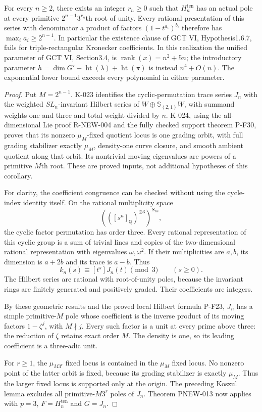 \begin{corollary}
For every $n\ge2$, there exists an integer $r_n\ge0$ such that
$H_n^{\mathrm{ten}}$ has an actual pole at every primitive
$2^{n-1}3^{r_n}$th root of unity. Every rational presentation
of this series with denominator a product of factors
$(1-t^{a_i})^{b_i}$ therefore has $\max_i a_i\ge2^{n-1}$.
In particular the existence clause of GCT VI,
Hypothesis1.6.7, fails for triple-rectangular Kronecker
coefficients. In this realization the unified parameter of
GCT VI, Section3.4, is $\operatorname{rank}(x)=n^2+5n$;
the introductory parameter
$h=\dim G'+\operatorname{ht}(\lambda)+\operatorname{ht}(\pi)$
is instead $n^4+O(n)$. The exponential lower bound exceeds
every polynomial in either parameter.
\end{corollary}
\begin{proof}
Put $M=2^{n-1}$. K-023 identifies the cyclic-permutation
trace series $J_n$ with the weighted $SL_n$-invariant Hilbert
series of $W\oplus\mathbb S_{(2,1)}W$, with summand weights
one and three and total weight divided by $n$.
K-024, using the all-dimensional Lie proof R-NEW-004 and
the fully checked support theorem P-F30, proves that its
nonzero $\mu_M$-fixed quotient locus is one grading orbit,
with full grading stabilizer exactly $\mu_M$, density-one
curve closure, and smooth ambient quotient along that orbit.
Its nontrivial moving eigenvalues are powers of a primitive
$M$th root. These are proved inputs, not additional
hypotheses of this corollary.

For clarity, the coefficient congruence can be checked without
using the cycle-index identity itself. On the rational
multiplicity space
\[
 (([s^n]_{\mathbb Q})^{\otimes3})^{S_{ns}},
\]
the cyclic factor permutation has order three. Every rational
representation of this cyclic group is a sum of trivial lines
and copies of the two-dimensional rational representation
with eigenvalues $\omega,\omega^2$.
If their multiplicities are $a,b$, its dimension is $a+2b$
and its trace is $a-b$. Thus
\[
                     k_n(s)\equiv[t^s]J_n(t)\pmod3
                         \qquad(s\ge0).
 \tag{PNEW-M9}
\]
The Hilbert series are rational with root-of-unity poles,
because the invariant rings are finitely generated and
positively graded. Their coefficients are integers.

By these geometric results and the proved local
Hilbert formula P-F23, $J_n$ has a simple primitive-$M$ pole
whose coefficient is the inverse product of its moving
factors $1-\zeta^j$, with $M\nmid j$.
Every such factor is a unit at every prime above three:
the reduction of $\zeta$ retains exact order $M$.
The density is one, so its leading coefficient is a
three-adic unit.

For $r\ge1$, the $\mu_{M3^r}$ fixed locus is contained
in the $\mu_M$ fixed locus. No nonzero point of the latter
orbit is fixed, because its grading stabilizer is exactly
$\mu_M$. Thus the larger fixed locus is supported only
at the origin. The preceding Koszul lemma excludes all
primitive-$M3^r$ poles of $J_n$.
Theorem PNEW-013 now applies with $p=3$, $F=H_n^{\mathrm{ten}}$
and $G=J_n$.
\end{proof}

